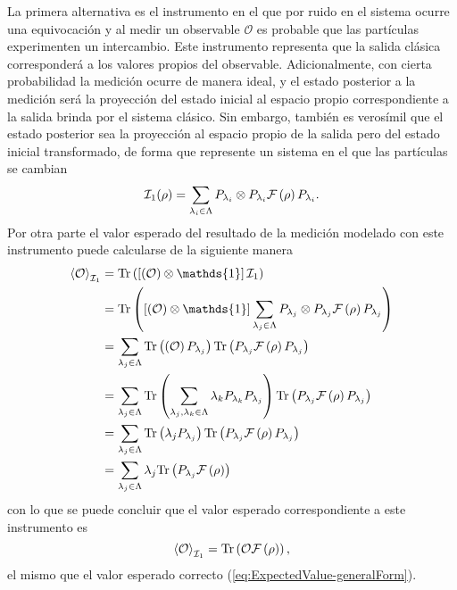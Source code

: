 La primera alternativa es el instrumento en el que por ruido en el sistema
ocurre una equivocación y al medir un observable $\mathcal{O}$ es probable que
las partículas experimenten un intercambio. Este instrumento representa que la
salida clásica corresponderá a los valores propios del observable.
Adicionalmente, con cierta probabilidad la medición ocurre de manera ideal, y
el estado posterior a la medición será la proyección del estado inicial al
espacio propio correspondiente a la salida brinda por el sistema clásico. Sin
embargo, también es verosímil que el estado posterior sea la proyección al
espacio propio de la salida pero del estado inicial transformado, de forma que
represente un sistema en el que las partículas se cambian
\begin{equation}\label{eq:1instrumentnp}
    \mathcal{I}_1(\rho)=\sum_{\lambda_i \in \Lambda }P_{\lambda_i}\otimes P_{\lambda_i}\mathcal{F}\left(\rho\right)P_{\lambda_i}.
\end{equation} 
Por otra parte el valor esperado del resultado de la medición modelado con este
instrumento puede calcularse de la siguiente manera 
\begin{equation*}
    \begin{split}
        \left \la \mathcal{O} \right \ra_{\mathcal{I}_1}&=\tr\left( \left[\left(\mathcal{O}\right) \otimes \mathds{1}\right]\mathcal{I}_1\right) \\
        &=\tr\left(\left[ \left(\mathcal{O}\right)\otimes \mathds{1}\right]\sum_{\lambda_j \in \Lambda}P_{\lambda_j}\otimes P_{\lambda_j}\fuzzy{\rho}P_{\lambda_j} \right)\\
        &=\sum_{\lambda_j\in \Lambda} \tr\left(\left(\mathcal{O}\right) P_{\lambda_j}\right) \tr\left(P_{\lambda_j}\fuzzy{\rho} P_{\lambda_j}\right) \\
        &=\sum_{\lambda_j\in \Lambda} \tr\left(\sum_{{\lambda_j, \lambda_k \in \Lambda}}\lambda_k P_{\lambda_k} P_{\lambda_j}\right) \tr\left(P_{\lambda_j}\fuzzy{\rho} P_{\lambda_j}\right)  \\
        &=\sum_{\lambda_j \in\Lambda} \tr\left(\lambda_j P_{\lambda_j}\right) \tr\left(P_{\lambda_j}\fuzzy{\rho}P_{\lambda_j}\right) \\
        &=\sum_{\lambda_j \in \Lambda} \lambda_j \tr\left(P_{\lambda_j}\fuzzy{\rho}\right) \\
    \end{split}
\end{equation*} 
con lo que se puede concluir que el valor esperado correspondiente a este instrumento es 
\begin{equation}\label{eq:valor-esperado-1instrumentnp}
        \left \langle\mathcal{O} \right \rangle_{\mathcal{I}_1}= {\rm Tr}\left( \mathcal{O} \mathcal{F}\left(\rho\right)\right),
\end{equation}
el mismo que el valor esperado correcto ({\ref{eq:ExpectedValue-generalForm}}).

